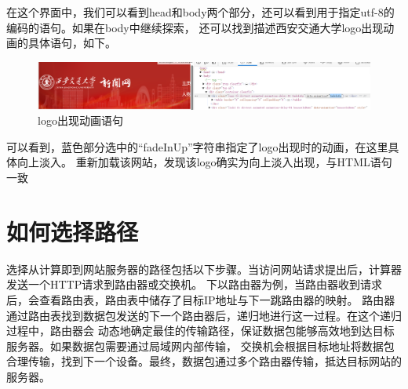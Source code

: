 \documentclass[UTF8]{ctexart}
\begin{document}
    在这个界面中，我们可以看到head和body两个部分，还可以看到用于指定utf-8的编码的语句。如果在body中继续探索，
    还可以找到描述西安交通大学logo出现动画的具体语句，如下。

\begin{figure}[h]
    \centering
    \includegraphics[width=1.0\textwidth]{demo2.png}
    \caption*{logo出现动画语句}
    \end{figure}

可以看到，蓝色部分选中的“fadeInUp”字符串指定了logo出现时的动画，在这里具体向上淡入。
重新加载该网站，发现该logo确实为向上淡入出现，与HTML语句一致

\section{如何选择路径}
选择从计算即到网站服务器的路径包括以下步骤。当访问网站请求提出后，计算器发送一个HTTP请求到路由器或交换机。
下以路由器为例，当路由器收到请求后，会查看路由表，路由表中储存了目标IP地址与下一跳路由器的映射。
路由器通过路由表找到数据包发送的下一个路由器后，递归地进行这一过程。在这个递归过程中，路由器会
动态地确定最佳的传输路径，保证数据包能够高效地到达目标服务器。如果数据包需要通过局域网内部传输，
交换机会根据目标地址将数据包合理传输，找到下一个设备。最终，数据包通过多个路由器传输，抵达目标网站的服务器。
\end{document}
